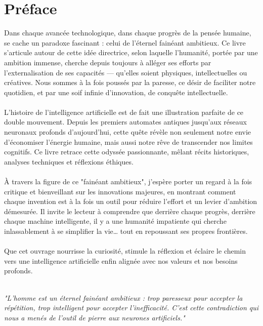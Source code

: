 \documentclass[12pt,a4paper]{book}
\begin{document}
\newpage
\pagestyle{empty}
\chapter*{Préface} %
Dans chaque avancée technologique, dans chaque progrès de la pensée humaine, se cache un paradoxe fascinant : celui de l'éternel fainéant ambitieux. Ce livre s'articule autour de cette idée directrice, selon laquelle l'humanité, portée par une ambition immense, cherche depuis toujours à alléger ses efforts par l'externalisation de ses capacités — qu'elles soient physiques, intellectuelles ou créatives. Nous sommes à la fois poussés par la paresse, ce désir de faciliter notre quotidien, et par une soif infinie d'innovation, de conquête intellectuelle.
\\ \\
L'histoire de l'intelligence artificielle est de fait une illustration parfaite de ce double mouvement. Depuis les premiers automates antiques jusqu'aux réseaux neuronaux profonds d'aujourd'hui, cette quête révèle non seulement notre envie d'économiser l'énergie humaine, mais aussi notre rêve de transcender nos limites cognitifs. Ce livre retrace cette odyssée passionnante, mêlant récits historiques, analyses techniques et réflexions éthiques.
\\ \\
À travers la figure de ce "fainéant ambitieux", j'espère porter un regard à la fois critique et bienveillant sur les innovations majeures, en montrant comment chaque invention est à la fois un outil pour réduire l'effort et un levier d'ambition démesurée. Il invite le lecteur à comprendre que derrière chaque progrès, derrière chaque machine intelligente, il y a une humanité impatiente qui cherche inlassablement à se simplifier la vie… tout en repoussant ses propres frontières.
\\ \\
Que cet ouvrage nourrisse la curiosité, stimule la réflexion et éclaire le chemin vers une intelligence artificielle enfin alignée avec nos valeurs et nos besoins profonds.
\\ \\
\begin{citationmd}
\centering\itshape\large
"L'homme est un éternel fainéant ambitieux : trop paresseux pour accepter la répétition, trop intelligent pour accepter l'inefficacité. C'est cette contradiction qui nous a menés de l'outil de pierre aux neurones artificiels."
\end{citationmd}
 
\end{document}
